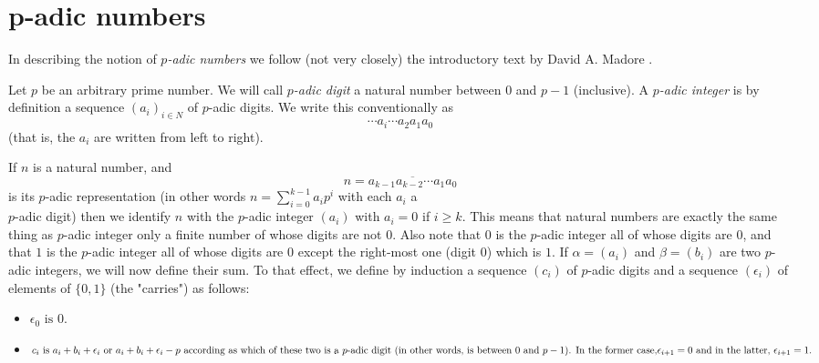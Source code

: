 \documentclass{llncs}
\begin{document}
\section{p-adic numbers} 

In describing the notion of {\em $p$-adic numbers} we follow (not very closely) the introductory text by David A. Madore \cite{M00}. 

Let $p$ be an arbitrary prime number.
We will call {\em $p$-adic digit} a natural number between $0$ and $p-1$ (inclusive). A
{\em $p$-adic integer} is by definition a sequence $(a_i)_{i \in N}$ of $p$-adic digits. We write this
conventionally as
$$
\cdots a_i \cdots  a_2 a_1 a_0
$$
(that is, the $a_i$ are written from left to right).

If $n$ is a natural number, and
$$
n = \overline{a_{k-1} a_{k-2} \cdots  a_1 a_0}
$$
is its $p$-adic representation (in other words 
$n = \sum ^{k-1}_{i=0}  a_ip^i$ with each $a_i$ a\\ $p$-adic
digit) then we identify $n$ with the $p$-adic integer $(a_i)$ with $a_i = 0$ if $i \geq k$. This
means that natural numbers are exactly the same thing as $p$-adic integer only a
finite number of whose digits are not $0$. Also note that $0$ is the $p$-adic integer all of
whose digits are $0$, and that $1$ is the $p$-adic integer all of whose digits are $0$ except
the right-most one (digit $0$) which is $1$.
If $\alpha  = (a_i)$ and $\beta = (b_i)$ are two $p$-adic integers, we will now define their
sum. To that effect, we define by induction a sequence $(c_i)$ of $p$-adic digits and a
sequence $(\epsilon _i)$ of elements of $\{0, 1\}$ (the "carries") as follows:\\


\begin{itemize}
  \item  $\epsilon _0 \mbox{ is } 0.$\\
  \item  $c_i \mbox{ is } a_i + b_i + \epsilon _i \mbox{ or } a_i + b_i + \epsilon _i - p \mbox{ according as which of these two is a }\\
p\mbox{-adic digit (in other words, is between $0$ and $p - 1$). In the former case,}\\
\epsilon _{i+1} = 0 \mbox{ and in the latter, } \epsilon _{i+1} = 1.$
\end{itemize}
\end{document}
